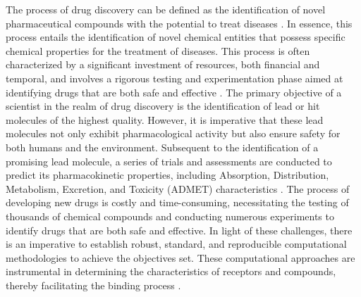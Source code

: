 The process of drug discovery can be defined as the identification of novel pharmaceutical compounds with the potential to treat diseases \cite{Paul2010,Hughes2011}. In essence, this process entails the identification of novel chemical entities that possess specific chemical properties for the treatment of diseases. This process is often characterized by a significant investment of resources, both financial and temporal, and involves a rigorous testing and experimentation phase aimed at identifying drugs that are both safe and effective \cite{Schaduangrat2020,Sliwoski2014}. The primary objective of a scientist in the realm of drug discovery is the identification of lead or hit molecules of the highest quality. However, it is imperative that these lead molecules not only exhibit pharmacological activity but also ensure safety for both humans and the environment. Subsequent to the identification of a promising lead molecule, a series of trials and assessments are conducted to predict its pharmacokinetic properties, including Absorption, Distribution, Metabolism, Excretion, and Toxicity (ADMET) characteristics \cite{Schaduangrat2020,Lin2003,Naithani2024}. The process of developing new drugs is costly and time-consuming, necessitating the testing of thousands of chemical compounds and conducting numerous experiments to identify drugs that are both safe and effective. In light of these challenges, there is an imperative to establish robust, standard, and reproducible computational methodologies to achieve the objectives set. These computational approaches are instrumental in determining the characteristics of receptors and compounds, thereby facilitating the binding process \cite{Li2021}.

